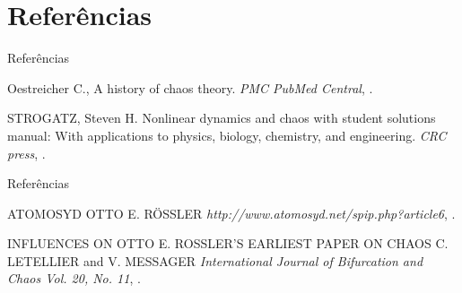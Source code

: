 \documentclass{beamer}
\begin{document}
\section{Referências}
\begin{frame}{Referências}


\begin{thebibliography}{3}

\beamertemplatearticlebibitems
{}
Oestreicher C.,
\newblock A history of chaos theory.
\newblock\emph{PMC PubMed Central},
.

\beamertemplatearticlebibitems
{}
STROGATZ, Steven H. 
\newblock Nonlinear dynamics and chaos with student solutions manual: With applications to physics, biology, chemistry, and engineering.
\newblock\emph{CRC press},
.

        \end{thebibliography}
\end{frame}

\begin{frame}{Referências}
	\begin{thebibliography}{3}
		
		\beamertemplatearticlebibitems
		\bibitem{}
		ATOMOSYD
		\newblock OTTO E. RÖSSLER
		\newblock\emph{http://www.atomosyd.net/spip.php?article6},
		.
		
		\beamertemplatearticlebibitems
		INFLUENCES ON OTTO E. ROSSLER’S EARLIEST PAPER ON CHAOS
		\newblock C. LETELLIER and V. MESSAGER
		\newblock\emph{International Journal of Bifurcation and Chaos Vol. 20, No. 11},
		.
		
	\end{thebibliography}
\end{frame}

\end{document}
